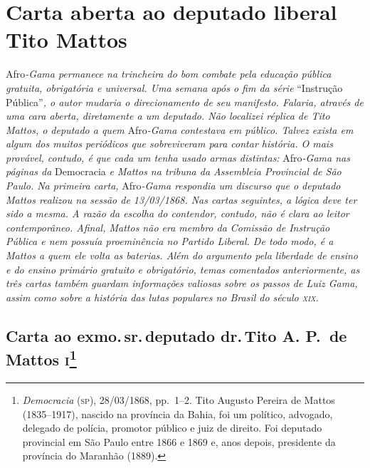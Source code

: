 \part{Carta aberta ao deputado liberal Tito Mattos}

\begin{argumento}
Afro\emph{-Gama permanece na trincheira do bom combate pela educação
pública gratuita, obrigatória e universal. Uma semana após o fim da
série} ``Instrução Pública''\emph{, o autor mudaria o direcionamento de
seu manifesto. Falaria, através de uma cara aberta, diretamente a um
deputado. Não localizei réplica de Tito Mattos, o deputado a quem}
Afro\emph{-Gama contestava em público. Talvez exista em algum dos muitos
periódicos que sobreviveram para contar história. O mais provável,
contudo, é que cada um tenha usado armas distintas:} Afro\emph{-Gama nas
páginas da} Democracia \emph{e Mattos na tribuna da Assembleia
Provincial de São Paulo. Na primeira carta,} Afro\emph{-Gama respondia
um discurso que o deputado Mattos realizou na sessão de 13/03/1868. Nas
cartas seguintes, a lógica deve ter sido a mesma. A razão da escolha do
contendor, contudo, não é clara ao leitor contemporâneo. Afinal, Mattos
não era membro da Comissão de Instrução Pública e nem possuía
proeminência no Partido Liberal. De todo modo, é a Mattos a quem ele
volta as baterias. Além do argumento pela liberdade de ensino e do
ensino primário gratuito e obrigatório, temas comentados anteriormente,
as três cartas também guardam informações valiosas sobre os passos de
Luiz Gama, assim como sobre a história das lutas populares no Brasil do
século \textsc{xix}.}
\end{argumento}

\chapter{Carta ao exmo.\,sr.\,deputado dr.\,Tito A. P.~de Mattos
\textsc{i}\footnote{\emph{Democracia} (\textsc{sp}), 28/03/1868, pp.~1--2. Tito
  Augusto Pereira de Mattos (1835--1917), nascido na província da Bahia,
  foi um político, advogado, delegado de polícia, promotor público e
  juiz de direito. Foi deputado provincial em São Paulo entre 1866 e
  1869 e, anos depois, presidente da província do Maranhão (1889).}}

